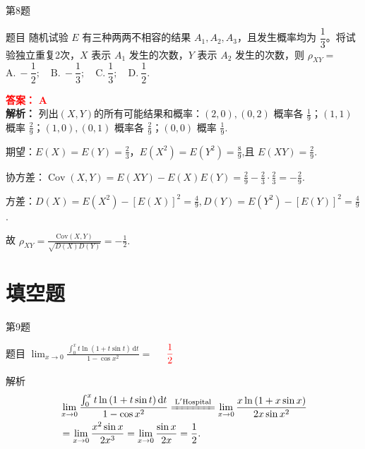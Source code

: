 \documentclass[aspectratio=169]{beamer}
\begin{document}
\begin{frame}{第8题}
\begin{block}{题目}
随机试验 \(E\) 有三种两两不相容的结果 \(A_1,A_2,A_3\)，且发生概率均为 \(\dfrac13\)。将试验独立重复2次，\(X\) 表示 \(A_1\) 发生的次数，\(Y\) 表示 \(A_2\) 发生的次数，则 \(\rho_{XY}=\) \\
$\mathrm{A.}\ -\dfrac{1}{2};\quad \mathrm{B.}\ -\dfrac{1}{3};\quad \mathrm{C.}\ \dfrac{1}{3};\quad \mathrm{D.}\ \dfrac{1}{2}.$

\textcolor{red}{\textbf{答案：} \(\mathbf{A}\)}\\
\textbf{解析：}
列出\((X,Y)\)的所有可能结果和概率：\((2,0),(0,2)\) 概率各 \(\frac{1}{9}\)；\((1,1)\) 概率 \(\frac{2}{9}\)；\((1,0),(0,1)\) 概率各 \(\frac{2}{9}\)；\((0,0)\) 概率 \(\frac{1}{9}\).

期望：\(E(X)=E(Y)=\frac23\)，\(E(X^2)=E(Y^2)=\frac89\),且 \(E(XY)=\frac29\).

协方差：\(\operatorname{Cov}(X,Y)=E(XY)-E(X)E(Y)=\frac29-\frac23\cdot\frac23=-\frac29\).

方差：\(D(X)=E(X^2)-[E(X)]^2=\frac49,
D(Y)=E(Y^2)-[E(Y)]^2=\frac49\).

故 \(\rho _{XY}=\frac{\mathrm{Cov}\left( X,Y \right)}{\sqrt{D\left( X \right) D\left( Y \right)}}=-\frac{1}{2}.\)
\end{block}
\end{frame}

\section{填空题}

\begin{frame}{第9题}
\begin{block}{题目}
\(\displaystyle\lim _{x \to 0} \frac{\int_{0}^{x} t \ln (1+t \sin t) \,\mathrm{d} t}{1-\cos x^{2}}=\) \underline{$\quad\textcolor{red}{\dfrac{1}{2}}\quad$} 
\end{block}

\begin{block}{解析}
\begin{align*}
&\lim_{x\rightarrow 0} \frac{\int_0^x{t\ln \left( 1+t\sin t \right) \mathrm{d}t}}{1-\cos x^2}\xlongequal{\mathrm{L}' \mathrm{Hospital}}\lim_{x\rightarrow 0} \frac{x\ln \left( 1+x\sin x \right)}{2x\sin x^2}\\
&=\lim_{x\rightarrow 0} \frac{x^2\sin x}{2x^3}
=\lim_{x\rightarrow 0} \frac{\sin x}{2x}=\frac{1}{2}.
\end{align*}
\end{block}
\end{frame}
\end{document}

